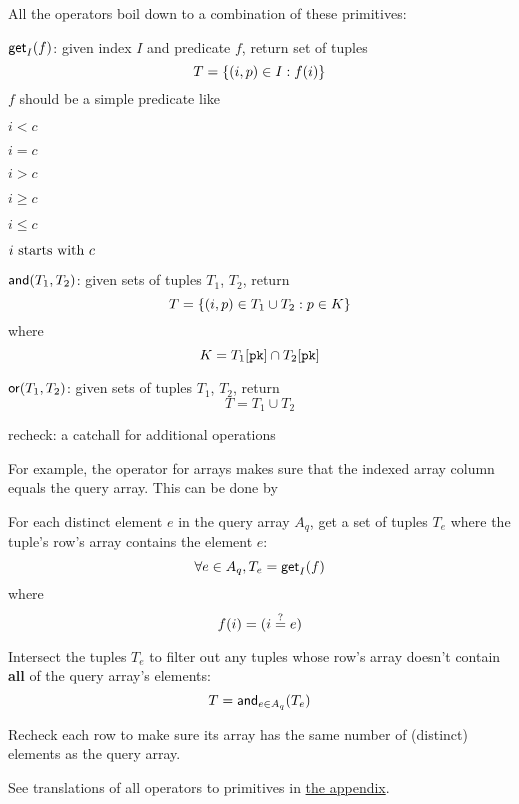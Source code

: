 All the operators boil down to a combination of these primitives:

\begin{oparts}
\item
  $\mathsf{get}_I(f)$:
  given index $I$ and predicate $f$, return set of tuples
  \[
    T = \lbrace(i, p) \in I : f(i)\rbrace
  \]
  $f$ should be a simple predicate like
  \begin{oparts}
  \item
    $i < c$
  \item
    $i = c$
  \item
    $i > c$
  \item
    $i \geq c$
  \item
    $i \leq c$
  \item
    $i~\textnormal{starts with}~c$
  \end{oparts}
\item
  $\mathsf{and}(T_1, T_2)$:
  given sets of tuples $T_1$, $T_2$, return
  \[
    T = \lbrace(i, p) \in T_1 \cup T_2 : p \in K\rbrace
  \]
  where
  \[
    K = T_1[\mathtt{pk}] \cap T_2[\mathtt{pk}]
  \]
\item
  $\mathsf{or}(T_1, T_2)$:
  given sets of tuples $T_1$, $T_2$, return
  \[
    T = T_1 \cup T_2
  \]
\item
  recheck: a catchall for additional operations
\end{oparts}

For example, the \sqlinline{=} operator for arrays makes sure that the indexed
array column equals the query array. This can be done by

\begin{nparts}
\item
  For each distinct element $e$ in the query array $A_q$, get a set of tuples
  $T_e$ where the tuple's row's array contains the element $e$:
  \[
    \forall e \in A_q, T_e = \mathsf{get}_I(f)
  \]
  where
  \[
    f(i) = \lparen i \overset{?}{=} e\rparen
  \]
\item
  Intersect the tuples $T_e$ to filter out any tuples whose row's array doesn't
  contain \textbf{all} of the query array's elements:
  \[
    T = \mathsf{and}_{e \in A_q}(T_e)
  \]
\item
  Recheck each row to make sure its array has the same number of (distinct)
  elements as the query array.
\end{nparts}

See translations of all operators to primitives in \protect\hyperlink{%
  operators-to-primitives}{%
  the appendix}.
